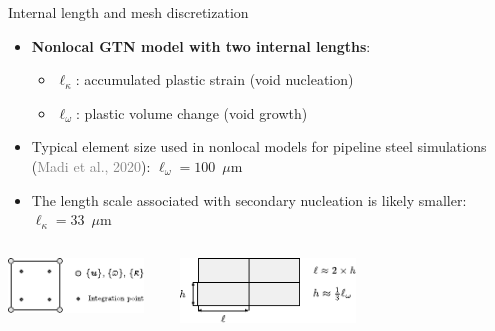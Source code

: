 \documentclass[9pt]{beamer}
\begin{document}

\begin{frame}{Internal length and mesh discretization}

    \begin{itemize}
        \item \textbf{Nonlocal GTN model with two internal lengths}: 
        \vspace{0.15cm}
        \begin{itemize}
        	\item $\ell_{\kappa}$: accumulated plastic strain (void nucleation)
        \vspace{0.15cm}
        \item $\ell_{\omega}$: plastic volume change (void growth)
        \end{itemize}
        \vspace{0.15cm}
        \item Typical element size used in nonlocal models for pipeline
steel simulations (\textcolor{gray}{Madi et al., 2020}): $\ell_{\omega} = 100$~$\mu$m
\vspace{0.15cm}
		\item The length scale associated with secondary nucleation is
likely smaller: $\ell_{\kappa} = 33$~$\mu$m
    \end{itemize}

    \vspace{0.7cm}

    \begin{columns}
        \centering
        \includegraphics[width=0.9\textwidth]{Images/nlgeom_si_ig.pdf}
        
        \centering
        \includegraphics[width=0.9\textwidth]{Images/internal_length.pdf}
    \end{columns}

\end{frame}
\end{document}
